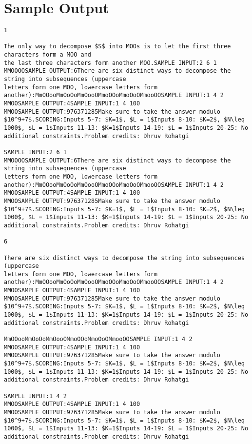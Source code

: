 \documentclass[12pt]{article}
\begin{document}
\section*{Sample Output}
\begin{verbatim}
1

The only way to decompose $S$ into MOOs is to let the first three characters form a MOO and
the last three characters form another MOO.SAMPLE INPUT:2 6 1
MMOOOOSAMPLE OUTPUT:6There are six distinct ways to decompose the string into subsequences (uppercase
letters form one MOO, lowercase letters form another):MmOOooMmOoOoMmOooOMmoOOoMmoOoOMmooOOSAMPLE INPUT:1 4 2
MMOOSAMPLE OUTPUT:4SAMPLE INPUT:1 4 100
MMOOSAMPLE OUTPUT:976371285Make sure to take the answer modulo $10^9+7$.SCORING:Inputs 5-7: $K=1$, $L = 1$Inputs 8-10: $K=2$, $N\leq 1000$, $L = 1$Inputs 11-13: $K=1$Inputs 14-19: $L = 1$Inputs 20-25: No additional constraints.Problem credits: Dhruv Rohatgi

SAMPLE INPUT:2 6 1
MMOOOOSAMPLE OUTPUT:6There are six distinct ways to decompose the string into subsequences (uppercase
letters form one MOO, lowercase letters form another):MmOOooMmOoOoMmOooOMmoOOoMmoOoOMmooOOSAMPLE INPUT:1 4 2
MMOOSAMPLE OUTPUT:4SAMPLE INPUT:1 4 100
MMOOSAMPLE OUTPUT:976371285Make sure to take the answer modulo $10^9+7$.SCORING:Inputs 5-7: $K=1$, $L = 1$Inputs 8-10: $K=2$, $N\leq 1000$, $L = 1$Inputs 11-13: $K=1$Inputs 14-19: $L = 1$Inputs 20-25: No additional constraints.Problem credits: Dhruv Rohatgi

6

There are six distinct ways to decompose the string into subsequences (uppercase
letters form one MOO, lowercase letters form another):MmOOooMmOoOoMmOooOMmoOOoMmoOoOMmooOOSAMPLE INPUT:1 4 2
MMOOSAMPLE OUTPUT:4SAMPLE INPUT:1 4 100
MMOOSAMPLE OUTPUT:976371285Make sure to take the answer modulo $10^9+7$.SCORING:Inputs 5-7: $K=1$, $L = 1$Inputs 8-10: $K=2$, $N\leq 1000$, $L = 1$Inputs 11-13: $K=1$Inputs 14-19: $L = 1$Inputs 20-25: No additional constraints.Problem credits: Dhruv Rohatgi

MmOOooMmOoOoMmOooOMmoOOoMmoOoOMmooOOSAMPLE INPUT:1 4 2
MMOOSAMPLE OUTPUT:4SAMPLE INPUT:1 4 100
MMOOSAMPLE OUTPUT:976371285Make sure to take the answer modulo $10^9+7$.SCORING:Inputs 5-7: $K=1$, $L = 1$Inputs 8-10: $K=2$, $N\leq 1000$, $L = 1$Inputs 11-13: $K=1$Inputs 14-19: $L = 1$Inputs 20-25: No additional constraints.Problem credits: Dhruv Rohatgi

SAMPLE INPUT:1 4 2
MMOOSAMPLE OUTPUT:4SAMPLE INPUT:1 4 100
MMOOSAMPLE OUTPUT:976371285Make sure to take the answer modulo $10^9+7$.SCORING:Inputs 5-7: $K=1$, $L = 1$Inputs 8-10: $K=2$, $N\leq 1000$, $L = 1$Inputs 11-13: $K=1$Inputs 14-19: $L = 1$Inputs 20-25: No additional constraints.Problem credits: Dhruv Rohatgi


\end{verbatim}
\end{document}
